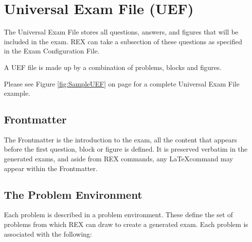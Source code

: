 \documentclass{article}
\begin{document}
\section{Universal Exam File (UEF)}
The Universal Exam File stores all questions, answers, and figures that will be
included in the exam. REX can take a subsection of these questions as specified
in the Exam Configuration File. 

A UEF file is made up by a combination of problems, blocks and figures.

Please see Figure \ref{fig:SampleUEF} on page \pageref{fig:SampleUEF} for 
a complete Universal Exam File example.

\subsection{Frontmatter}
The Frontmatter is the introduction to the exam, all the content that appears before the first question, block or figure is defined. It is preserved verbatim in the generated exams, and aside from REX commands, any \LaTeX command may appear within the Frontmatter.

\subsection{The Problem Environment}
Each problem is described in a problem environment. These define the set of problems from which REX can draw to create a generated exam. Each problem is associated with the following:
\end{document}
